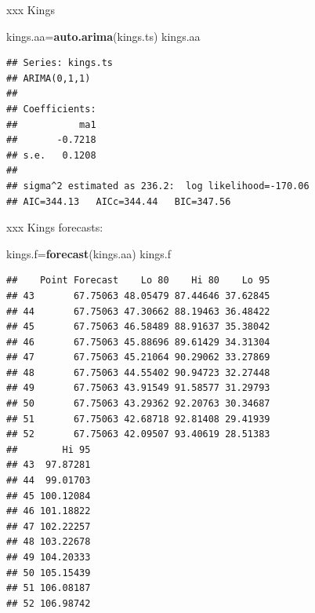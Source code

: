 \documentclass[ignorenonframetext,]{beamer}
\newenvironment{Shaded}{\begin{snugshade}}{\end{snugshade}}
\newcommand{\KeywordTok}[1]{\textcolor[rgb]{0.13,0.29,0.53}{\textbf{#1}}}
\newcommand{\NormalTok}[1]{#1}
\begin{document}
\begin{frame}[fragile]{xxx Kings}
\protect\hypertarget{xxx-kings}{}

\begin{Shaded}
\begin{Highlighting}[]
\NormalTok{kings.aa=}\KeywordTok{auto.arima}\NormalTok{(kings.ts)}
\NormalTok{kings.aa}
\end{Highlighting}
\end{Shaded}

\begin{verbatim}
## Series: kings.ts 
## ARIMA(0,1,1) 
## 
## Coefficients:
##           ma1
##       -0.7218
## s.e.   0.1208
## 
## sigma^2 estimated as 236.2:  log likelihood=-170.06
## AIC=344.13   AICc=344.44   BIC=347.56
\end{verbatim}

\end{frame}

\begin{frame}[fragile]{xxx Kings forecasts:}
\protect\hypertarget{xxx-kings-forecasts}{}

\small

\begin{Shaded}
\begin{Highlighting}[]
\NormalTok{kings.f=}\KeywordTok{forecast}\NormalTok{(kings.aa)}
\NormalTok{kings.f}
\end{Highlighting}
\end{Shaded}

\begin{verbatim}
##    Point Forecast    Lo 80    Hi 80    Lo 95
## 43       67.75063 48.05479 87.44646 37.62845
## 44       67.75063 47.30662 88.19463 36.48422
## 45       67.75063 46.58489 88.91637 35.38042
## 46       67.75063 45.88696 89.61429 34.31304
## 47       67.75063 45.21064 90.29062 33.27869
## 48       67.75063 44.55402 90.94723 32.27448
## 49       67.75063 43.91549 91.58577 31.29793
## 50       67.75063 43.29362 92.20763 30.34687
## 51       67.75063 42.68718 92.81408 29.41939
## 52       67.75063 42.09507 93.40619 28.51383
##        Hi 95
## 43  97.87281
## 44  99.01703
## 45 100.12084
## 46 101.18822
## 47 102.22257
## 48 103.22678
## 49 104.20333
## 50 105.15439
## 51 106.08187
## 52 106.98742
\end{verbatim}

\normalsize

\end{frame}
\end{document}
